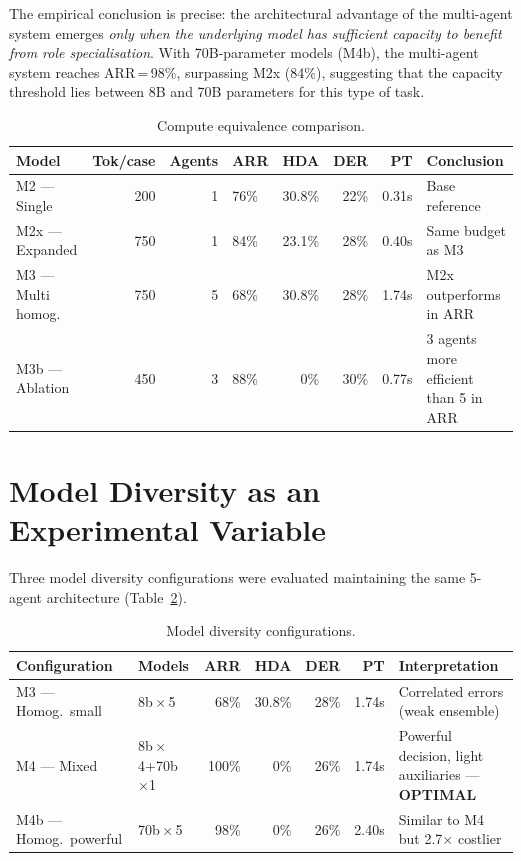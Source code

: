\documentclass[preprint,12pt,authoryear]{elsarticle}
\begin{document}
The empirical conclusion is precise: the architectural advantage of the
multi-agent system emerges \emph{only when the underlying model has sufficient
capacity to benefit from role specialisation}.
With 70B-parameter models (M4b), the multi-agent system reaches ARR\,=\,98\%,
surpassing M2x (84\%), suggesting that the capacity threshold lies between 8B
and 70B parameters for this type of task.

\begin{table}[htbp]
\centering
\caption{Compute equivalence comparison.}
\label{tab:compute}
\begin{tabularx}{\textwidth}{lrrlrrrX}
\toprule
\textbf{Model} & \textbf{Tok/case} & \textbf{Agents} &
  \textbf{ARR} & \textbf{HDA} & \textbf{DER} & \textbf{PT} &
  \textbf{Conclusion} \\
\midrule
M2 --- Single       & 200 & 1 & 76\%  & 30.8\% & 22\% & 0.31s &
  Base reference \\
M2x --- Expanded    & 750 & 1 & 84\%  & 23.1\% & 28\% & 0.40s &
  Same budget as M3 \\
M3 --- Multi homog. & 750 & 5 & 68\%  & 30.8\% & 28\% & 1.74s &
  M2x outperforms in ARR \\
M3b --- Ablation    & 450 & 3 & 88\%  & 0\%    & 30\% & 0.77s &
  3 agents more efficient than 5 in ARR \\
\bottomrule
\end{tabularx}
\end{table}

\section{Model Diversity as an Experimental Variable}
\label{sec:diversity}

Three model diversity configurations were evaluated maintaining the same
5-agent architecture (Table~\ref{tab:diversity}).

\begin{table}[htbp]
\centering
\caption{Model diversity configurations.}
\label{tab:diversity}
\begin{tabularx}{\textwidth}{llrrrrl}
\toprule
\textbf{Configuration} & \textbf{Models} &
  \textbf{ARR} & \textbf{HDA} & \textbf{DER} & \textbf{PT} &
  \textbf{Interpretation} \\
\midrule
M3 --- Homog.\ small  & 8b\,$\times$\,5         & 68\%  & 30.8\% & 28\% & 1.74s &
  Correlated errors (weak ensemble) \\
M4 --- Mixed          & 8b\,$\times$4+70b\,$\times$1 & 100\% & 0\%    & 26\% & 1.74s &
  Powerful decision, light auxiliaries --- \textbf{OPTIMAL} \\
M4b --- Homog.\ powerful & 70b\,$\times$\,5     & 98\%  & 0\%    & 26\% & 2.40s &
  Similar to M4 but 2.7$\times$ costlier \\
\bottomrule
\end{tabularx}
\end{table}
\end{document}

